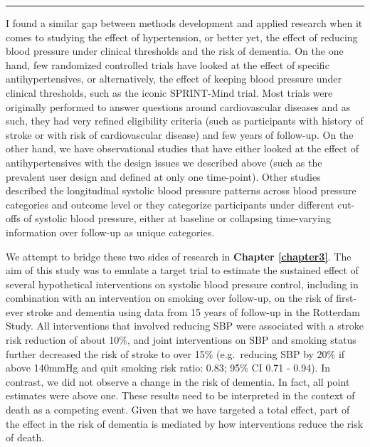 \documentclass[
]{book}
\begin{document}
\begin{center}\rule{0.5\linewidth}{0.5pt}\end{center}

I found a similar gap between methods development and applied research when it comes to studying the effect of hypertension, or better yet, the effect of reducing blood pressure under clinical thresholds and the risk of dementia. On the one hand, few randomized controlled trials have looked at the effect of specific antihypertensives, or alternatively, the effect of keeping blood pressure under clinical thresholds, such as the iconic SPRINT-Mind trial\autocite{williamson2019}. Most trials were originally performed to answer questions around cardiovascular diseases and as such, they had very refined eligibility criteria (such as participants with history of stroke or with risk of cardiovascular disease) and few years of follow-up\autocite{ace_inhibitors2000,forette2002,progress2003,lithell2003,diener2008,anderson2011,williamson2019}. On the other hand, we have observational studies that have either looked at the effect of antihypertensives with the design issues we described above (such as the prevalent user design and defined at only one time-point)\autocite{ding2020}. Other studies described the longitudinal systolic blood pressure patterns across blood pressure categories and outcome level\autocite{rajan2018} or they categorize participants under different cut-offs of systolic blood pressure, either at baseline or collapsing time-varying information over follow-up as unique categories\autocite{walker2019}.

We attempt to bridge these two sides of research in \textbf{Chapter \ref{chapter3}}. The aim of this study was to emulate a target trial to estimate the sustained effect of several hypothetical interventions on systolic blood pressure control, including in combination with an intervention on smoking over follow-up, on the risk of first-ever stroke and dementia using data from 15 years of follow-up in the Rotterdam Study. All interventions that involved reducing SBP were associated with a stroke risk reduction of about 10\%, and joint interventions on SBP and smoking status further decreased the risk of stroke to over 15\% (e.g.~reducing SBP by 20\% if above 140mmHg and quit smoking risk ratio: 0.83; 95\% CI 0.71 - 0.94). In contrast, we did not observe a change in the risk of dementia. In fact, all point estimates were above one. These results need to be interpreted in the context of death as a competing event. Given that we have targeted a total effect, part of the effect in the risk of dementia is mediated by how interventions reduce the risk of death\autocite{young2020}.
\end{document}
